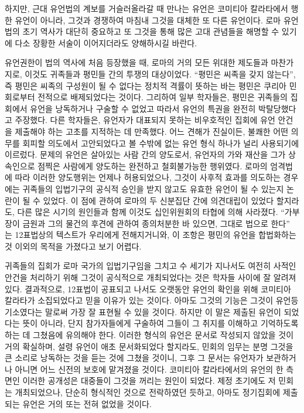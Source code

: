 하지만,
근대 유언법의 계보를 거슬러올라갈 때 만나는 유언은
코미티아 칼라타에서 행한 유언이 아니라,
그것과 경쟁하여 마침내 그것을 대체한 또 다른 유언이다.
로마 유언법의 초기 역사가 대단히 중요하고
또 그것을 통해 많은 고대 관념들을 해명할 수 있기에
다소 장황한 서술이 이어지더라도 양해하시길 바란다.

유언권한이 법의 역사에 처음 등장했을 때,
로마의 거의 모든 위대한 제도들과 마찬가지로,
이것도 귀족들과 평민들 간의 투쟁의 대상이었다.
``평민은 씨족을 갖지 않는다'',
즉 평민은 씨족의 구성원이 될 수 없다는 정치적 격률이 뜻하는 바는
평민은 쿠리아 민회로부터 전적으로 배제되었다는 것이다.
그리하여 일부 학자들은, 평민은 귀족들의 집회에서 유언을
낭독하거나 구술할 수 없었고
따라서 유언의 특권을 완전히 박탈당했다고 주장했다.
다른 학자들은, 유언자가 대표되지 못하는 비우호적인 집회에
유언 안건을 제출해야 하는 고초를 지적하는 데 만족했다.
어느 견해가 진실이든,
불쾌한 어떤 의무를 회피할 의도에서 고안되었다고 볼 수밖에 없는
유언 형식 하나가 널리 사용되기에 이르렀다.
문제의 유언은 살아있는 사람 간의 양도로서,
유언자의 가와 재산을 그가 상속인으로 점찍은 사람에게 양도하는
완전하고 철회불가능한 행위였다.
로마의 엄격법에 따라 이러한 양도행위는 언제나 허용되었으나,
그것이 사후적 효과를 의도하는 경우에는
귀족들의 입법기구의 공식적 승인을 받지 않고도 유효한 유언이 될 수 있는지
논란이 될 수 있었다.
이 점에 관하여 로마의 두 신분집단 간에 의견대립이 있었다 할지라도,
다른 많은 시기의 원인들과 함께
이것도 십인위원회의
타협에 의해 사라졌다.
``가부장이 금원과 그의 물건의 후견에 관하여 종의처분한 바
있으면, 그대로 법으로 한다''%
는
12표법상의 텍스트가 우리에게 전해지거니와,
이 조항은
평민의 유언을 합법화하는 것 이외의 목적을 가졌다고 보기 어렵다.

귀족들의 집회가 로마 국가의 입법기구임을 그치고 수 세기가 지나서도
여전히 사적인 안건을 처리하기 위해 그것이 공식적으로 개최되었다는 것은
학자들 사이에 잘 알려져 있다.
결과적으로, 12표법이 공표되고 나서도 오랫동안
유언의 확인을 위해 코미티아 칼라타가 소집되었다고 믿을 이유가 있는 것이다.
아마도 그것의 기능은
그것이 유언등기소였다는
말로써 가장 잘 표현될 수 있을 것이다.
하지만 이 말은 제출된 유언이 되었다는
뜻이 아니라,
단지 참가자들에게 구술하여 그들이 그 취지를 이해하고 기억하도록 하는 데
그쳤음에 유의해야 한다.
이러한 형식의 유언은 문서로 작성되지 않았을 것이 거의 확실하며,
설령 유언이 애초 문서화되었다 할지라도, 민회의 임무는 분명
그것을 큰 소리로 낭독하는 것을 듣는 것에 그쳤을 것이니,
그후 그 문서는 유언자가 보관하거나 아니면
어느 신전의 보호에 맡겨졌을 것이다.
코미티아 칼라타에서의 유언의 한 측면인
이러한 공개성은 대중들이 그것을 꺼리는 원인이 되었다.
제정 초기에도 저 민회는 개최되었으나,
단순히 형식적인 것으로 전락하였던 듯하고, 아마도
정기집회에 제출되는 유언은 거의 또는 전혀 없었을 것이다.

